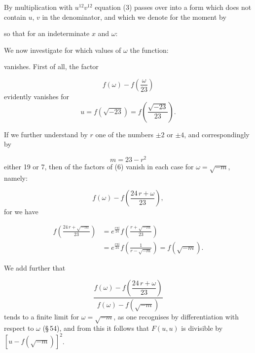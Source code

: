 
By multiplication with $u^{12}v^{12}$ equation (3) passes over into a form which does not contain $u$, $v$ in the denominator, and which we denote for the moment by


so that for an indeterminate $x$ and $\omega$:


We now investigate for which values of $\omega$ the function:


vanishes. First of all, the factor

\[
f(\omega) - f\left(\frac{\omega}{23}\right)
\]
evidently vanishes for
\[
u = f(\sqrt{-23}) = f\left(\frac{\sqrt{-23}}{23}\right).
\]

If we further understand by $r$ one of the numbers $\pm 2$ or $\pm 4$, and correspondingly by

\[
m = 23 - r^2
\]
either 19 or 7, then of the factors of (6)  vanish in each case for $\omega = \sqrt{-m}$, namely:

\[
f(\omega) - f\left(\frac{24\,r + \omega}{23}\right),
\]
for we have

\[
\begin{aligned}
f\left(\frac{24\,r + \sqrt{-m}}{23}\right) &= e^{\frac{r\pi i}{24}} f\left(\frac{r + \sqrt{-m}}{23}\right) \\
&= e^{\frac{r\pi i}{24}} f\left(\frac{1}{r - \sqrt{-m}}\right) = f(\sqrt{-m}).
\end{aligned}
\]

We add further that

\[
\frac{f(\omega) - f\left(\dfrac{24\,r + \omega}{23}\right)}{f(\omega) - f(\sqrt{-m})}
\]
tends to a finite limit for $\omega = \sqrt{-m}$, as one recognises by differentiation with respect to $\omega$ (\S\,54), and from this it follows that $F(u, u)$ is divisible by $[u - f(\sqrt{-m})]^2$.
